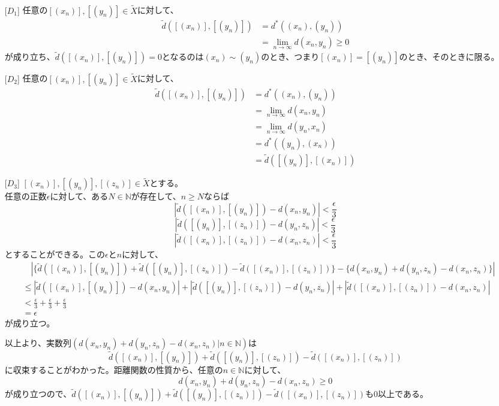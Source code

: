 \documentclass{jsarticle}
\begin{document}
\subsection{}
\begin{enumerate}
\item [{[$D_1$]}]
任意の$[(x_n)],[(y_n)]\in\tilde{X}$に対して、
\begin{align*}
\tilde{d}([(x_n)],[(y_n)])&=d^*((x_n),(y_n))\\
&=\lim_{n\to\infty}d(x_n,y_n)\geq 0
\end{align*}
が成り立ち、$\tilde{d}([(x_n)],[(y_n)])=0$となるのは$(x_n)\sim (y_n)$のとき、つまり$[(x_n)]= [(y_n)]$のとき、そのときに限る。

\item [{[$D_2$]}]
任意の$[(x_n)],[(y_n)]\in\tilde{X}$に対して、
\begin{align*}
\tilde{d}([(x_n)],[(y_n)])&=d^*((x_n),(y_n))\\
&=\lim_{n\to\infty}d(x_n,y_n)\\
&=\lim_{n\to\infty}d(y_n,x_n)\\
&=d^*((y_n),(x_n))\\
&=\tilde{d}([(y_n)],[(x_n)])
\end{align*}

\item [{[$D_3$]}]
$[(x_n)],[(y_n)],[(z_n)]\in\tilde{X}$とする。\\
任意の正数$\epsilon$に対して、ある$N\in\mathbb{N}$が存在して、$n\geq N$ならば
\[|\tilde{d}([(x_n)],[(y_n)])-d(x_n,y_n)|<\frac{\epsilon}{3}\]
\[|\tilde{d}([(y_n)],[(z_n)])-d(y_n,z_n)|<\frac{\epsilon}{3}\]
\[|\tilde{d}([(x_n)],[(z_n)])-d(x_n,z_n)|<\frac{\epsilon}{3}\]
とすることができる。この$\epsilon$と$n$に対して、
\begin{align*}
&\quad |\{\tilde{d}([(x_n)],[(y_n)])+\tilde{d}([(y_n)],[(z_n)])-\tilde{d}([(x_n)],[(z_n)])\}
-\{d(x_n,y_n)+d(y_n,z_n)-d(x_n,z_n)\}|\\
&\leq |\tilde{d}([(x_n)],[(y_n)])-d(x_n,y_n)|+|\tilde{d}([(y_n)],[(z_n)])-d(y_n,z_n)|+|\tilde{d}([(x_n)],[(z_n)])-d(x_n,z_n)|\\
&<\frac{\epsilon}{3}+\frac{\epsilon}{3}+\frac{\epsilon}{3}\\
&=\epsilon
\end{align*}
が成り立つ。

以上より、実数列$(d(x_n,y_n)+d(y_n,z_n)-d(x_n,z_n)|n\in\mathbb{N})$は
\[\tilde{d}([(x_n)],[(y_n)])+\tilde{d}([(y_n)],[(z_n)])-\tilde{d}([(x_n)],[(z_n)])\]
に収束することがわかった。距離関数の性質から、任意の$n\in\mathbb{N}$に対して、
\[d(x_n,y_n)+d(y_n,z_n)-d(x_n,z_n)\geq 0\]
が成り立つので、$\tilde{d}([(x_n)],[(y_n)])+\tilde{d}([(y_n)],[(z_n)])-\tilde{d}([(x_n)],[(z_n)])$も$0$以上である。

\end{enumerate}
\end{document}

